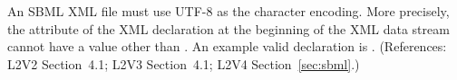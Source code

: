 An SBML XML file must use UTF-8 as the character encoding.  More
precisely, the  attribute of the XML declaration
at the beginning of the XML data stream cannot have a value other
than .  An example valid declaration is .  (References: L2V2
Section~4.1; L2V3 Section~4.1; L2V4 Section~\ref{sec:sbml}.)

